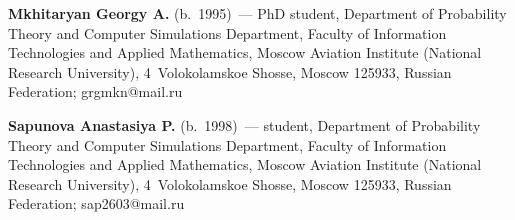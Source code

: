     \vspace*{3pt}
    
    \noindent
    \textbf{Mkhitaryan Georgy A.} (b.\ 1995)~--- PhD student, 
Department of Probability Theory and Computer Simulations Department, 
Faculty of Information Technologies and Applied Mathematics, Moscow 
Aviation Institute (National Research University), 4~Volokolamskoe Shosse, 
Moscow 125933, Russian Federation; \mbox{grgmkn@mail.ru}
    
    \vspace*{3pt}
    
    \noindent
    \textbf{Sapunova Anastasiya P.} (b.\ 1998)~--- student, Department 
of Probability Theory and Computer Simulations Department, Faculty of 
Information Technologies and Applied Mathematics, Moscow Aviation 
Institute (National Research University), 4~Volokolamskoe Shosse, 
Moscow 125933, Russian Federation; \mbox{sap2603@mail.ru}
  
      
\label{end\stat}

\renewcommand{\bibname}{\protect\rm Литература}  